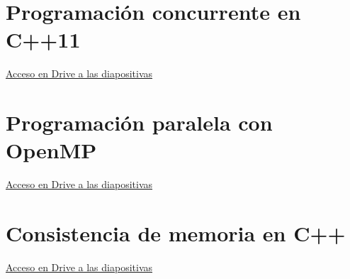 \documentclass[12pt, twoside, openright]{report} %
\begin{document}
\section{Programación concurrente en C++11}
\href{https://drive.google.com/file/d/16GPhGhX0H2Lodr96h2EhhSjKW09-OaNz}{Acceso en Drive a las diapositivas}

\section{Programación paralela con OpenMP}
\href{https://drive.google.com/file/d/16T6CITaTrlgx8yCjz_-N2JN8bc5NS2Sc}{Acceso en Drive a las diapositivas}

\section{Consistencia de memoria en C++}
\href{https://drive.google.com/file/d/16Jh-MoiLHr5AXle2sYLMhbCXf1Djayb3}{Acceso en Drive a las diapositivas}
\end{document}

